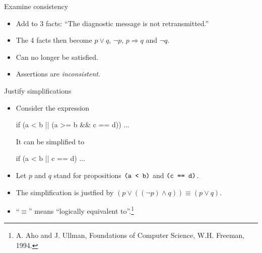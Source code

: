 \documentclass[style=sailor,size=12pt]{powerdot}
\begin{document}
\begin{wideslide}[bm=,toc=]{Examine consistency}
\begin{itemize}
\item Add to 3 facts: ``The diagnostic message is not retransmitted.''
\item The 4 facts then become $p\vee q$, $\neg p$, $p\Rightarrow q$ and $\neg q$.
\item Can no longer be satisfied.
\item Assertions are {\em inconsistent\/}.
\end{itemize}
\end{wideslide}

\begin{wideslide}[bm=,toc=]{Justify simplifications}
\begin{itemize}
\item Consider the expression
\vspace{-1em}
\begin{program}
if (a < b || (a >= b \&\& c == d)) ...
\end{program}
It can be simplified to
\vspace{-1em}
\begin{program}
if (a < b || c == d) ...
\end{program}
\item Let $p$ and $q$ stand for propositions $\mbox{\tt (a < b)}$ and $\mbox{\tt (c == d)}$.
\item The simplification is justfied by $(p\vee ((\neg p) \wedge q)) \equiv (p\vee q)$.
\item ``$\equiv$'' means ``logically equivalent to''.\footnote{
A. Aho and J. Ullman, Foundations of Computer Science, W.H. Freeman, 1994.}
\end{itemize}
\end{wideslide}
\end{document}
